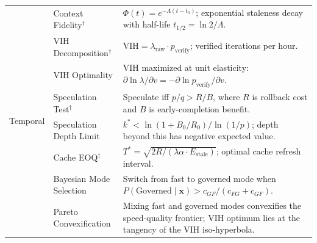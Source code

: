 \begin{table}[H]
\begin{tabular}{p{1.8cm}p{3.8cm}p{7.5cm}}
\multirow{8}{1.8cm}{Temporal}
    & Context Fidelity$^\dagger$ & $\Phi(t) = e^{-\Lambda(t-t_0)}$; exponential staleness decay with half-life $t_{1/2} = \ln 2 / \Lambda$. \\
    & VIH Decomposition$^\dagger$ & $\text{VIH} = \lambda_{\text{raw}} \cdot p_{\text{verify}}$; verified iterations per hour. \\
    & VIH Optimality & VIH maximized at unit elasticity: $\partial \ln \lambda / \partial v = -\partial \ln p_{\text{verify}} / \partial v$. \\
    & Speculation Test$^\dagger$ & Speculate iff $p/q > R/B$, where $R$ is rollback cost and $B$ is early-completion benefit. \\
    & Speculation Depth Limit & $k^* < \ln(1 + B_0/R_0)/\ln(1/p)$; depth beyond this has negative expected value. \\
    & Cache EOQ$^\dagger$ & $T^* = \sqrt{2R/(\lambda\alpha \cdot E_{\text{stale}})}$; optimal cache refresh interval. \\
    & Bayesian Mode Selection & Switch from fast to governed mode when $P(\text{Governed} \mid \mathbf{x}) > c_{GF}/(c_{FG} + c_{GF})$. \\
    & Pareto Convexification & Mixing fast and governed modes convexifies the speed-quality frontier; VIH optimum lies at the tangency of the VIH iso-hyperbola. \\

\midrule


\end{tabular}
\end{table}
